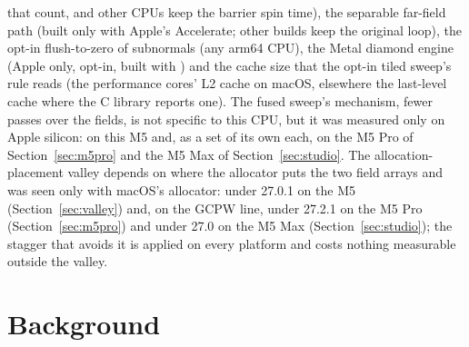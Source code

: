 that count, and other CPUs keep the barrier spin time), the separable far-field path (built only with Apple's
Accelerate; other builds keep the original loop), the opt-in flush-to-zero of subnormals (any arm64 CPU), the
Metal diamond engine (Apple only, opt-in, built with ) and the cache size that the opt-in tiled
sweep's  rule reads (the performance cores' L2 cache on macOS, elsewhere the last-level cache where the C
library reports one). The fused sweep's mechanism, fewer
passes over the fields, is not specific to this CPU, but it was measured only on Apple silicon: on this M5 and, as a
set of its own each, on the M5 Pro of Section~\ref{sec:m5pro} and the M5 Max of Section~\ref{sec:studio}. The allocation-placement valley
depends on where the allocator puts the two field arrays and was seen only with macOS's allocator: under 27.0.1 on
the M5 (Section~\ref{sec:valley}) and, on the GCPW line, under 27.2.1 on the M5 Pro (Section~\ref{sec:m5pro}) and under 27.0 on the M5 Max (Section~\ref{sec:studio}); the
stagger that avoids it is applied on every platform and costs nothing measurable
outside the valley.

\section{Background}\label{sec:background}

